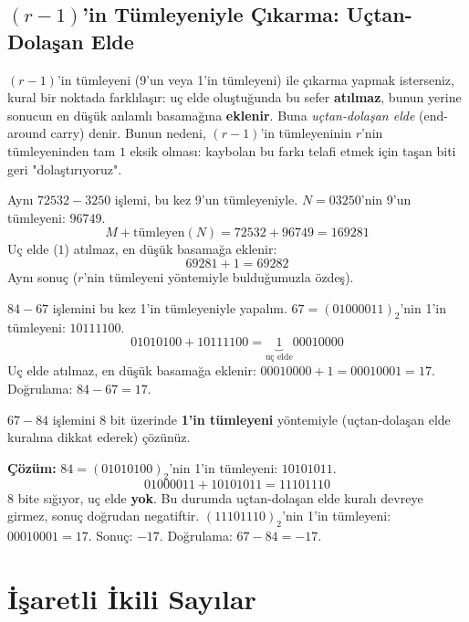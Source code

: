 \subsection{$(r{-}1)$'in Tümleyeniyle Çıkarma: Uçtan-Dolaşan Elde}
\label{sec:cikarma-r-1-tumleyeni}

$(r{-}1)$'in tümleyeni (9'un veya 1'in tümleyeni) ile çıkarma yapmak isterseniz, kural bir
noktada farklılaşır: uç elde oluştuğunda bu sefer \textbf{atılmaz}, bunun yerine sonucun en
düşük anlamlı basamağına \textbf{eklenir}. Buna \emph{uçtan-dolaşan elde} (end-around
carry) denir. Bunun nedeni, $(r{-}1)$'in tümleyeninin $r$'nin tümleyeninden tam $1$ eksik
olması: kaybolan bu farkı telafi etmek için taşan biti geri "dolaştırıyoruz".

\begin{ornek}
Aynı $72532-3250$ işlemi, bu kez 9'un tümleyeniyle. $N=03250$'nin 9'un tümleyeni: $96749$.
\[
M+\text{tümleyen}(N) = 72532+96749 = 169281
\]
Uç elde ($1$) atılmaz, en düşük basamağa eklenir:
\[
69281+1=69282
\]
Aynı sonuç ($r$'nin tümleyeni yöntemiyle bulduğumuzla özdeş). \checkmark
\end{ornek}

\begin{ornek}
$84-67$ işlemini bu kez 1'in tümleyeniyle yapalım. $67=(01000011)_2$'nin 1'in tümleyeni:
$10111100$.
\[
01010100+10111100 = \underbrace{1}_{\text{uç elde}}00010000
\]
Uç elde atılmaz, en düşük basamağa eklenir: $00010000+1=00010001=17$. Doğrulama:
$84-67=17$. \checkmark
\end{ornek}

\begin{alistirma}[\orta]
$67-84$ işlemini $8$ bit üzerinde \textbf{1'in tümleyeni} yöntemiyle (uçtan-dolaşan elde
kuralına dikkat ederek) çözünüz.
\end{alistirma}

\noindent\textbf{Çözüm:} $84=(01010100)_2$'nin 1'in tümleyeni: $10101011$.
\[
01000011+10101011 = 11101110
\]
$8$ bite sığıyor, uç elde \textbf{yok}. Bu durumda uçtan-dolaşan elde kuralı devreye
girmez, sonuç doğrudan negatiftir. $(11101110)_2$'nin 1'in tümleyeni: $00010001=17$. Sonuç:
$-17$. Doğrulama: $67-84=-17$. \checkmark

\section{İşaretli İkili Sayılar}
\label{sec:isaretli-sayilar}

